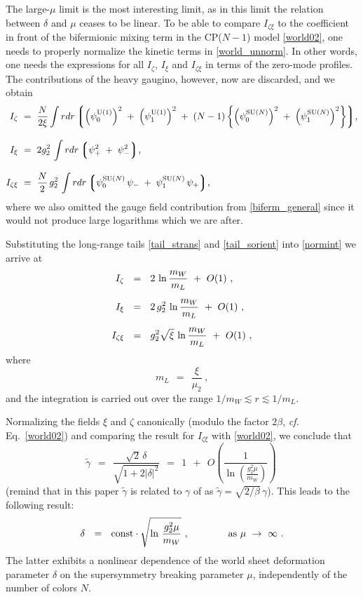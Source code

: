\documentclass[12pt]{article}
\def\beq{\begin{equation}}
\def\eeq{\end{equation}}
\newcommand{\wt}{\widetilde}
\newcommand{\lgr}{\left\lgroup}
\newcommand{\rgr}{\right\rgroup}
\newcommand{\poU}{\psi_0^{\rm U(1)}}
\newcommand{\plU}{\psi_1^{\rm U(1)}}
\newcommand{\poN}{\psi_0^\text{SU($N$)}}
\newcommand{\plN}{\psi_1^\text{SU($N$)}}
\newcommand{\tgamma}{\wt{\gamma}}
\begin{document}
	The large-$\mu$ limit is the most interesting limit, as in this limit the relation between $ \delta $ 
	and $ \mu $ ceases to be linear. 
	To be able to compare $ I_{\zeta\xi} $ to the coefficient in front of the bifermionic mixing term in 
	the CP($ N-1 $) model \eqref{world02}, one needs to properly normalize the kinetic terms in \eqref{world_unnorm}.
	In other words, one needs the expressions for all  $ I_\zeta $, $ I_\xi $ and $ I_{\zeta\xi} $ in terms
	of the zero-mode profiles.
	The contributions of the heavy gaugino, however, now are discarded, and we obtain
\begin{align}
%
\notag
	I_\zeta & ~=~ \frac{N}{2\xi} 
		\int r dr 
			\lgr \left(\poU\right)^2 \;+\; \left(\plU\right)^2 \;+\; 
				(N-1)\left\{\left(\poN\right)^2 \;+\;
				            \left(\plN\right)^2 \right\} 
			\rgr \!, \\[3mm]
%
\label{normint}
	I_\xi & ~=~ 2g_2^2\, 
		\int r dr \lgr  \psi_+^2 \;+\; \psi_-^2 \rgr\!, \\[3mm]
%
\notag
	I_{\zeta\xi} & ~=~
		\frac{N}{2}\, g_2^2\, 
		\int r dr \lgr \poN\, \psi_- \;+\; \plN\, \psi_+ \rgr \!,
\end{align}
	where we also omitted the gauge field contribution from \eqref{biferm_general} since it would not
	produce large logarithms which we are after. 

	Substituting the long-range tails \eqref{tail_strans} and \eqref{tail_sorient} into \eqref{normint}
	we arrive at
\begin{align}
%
\notag
	I_\zeta & ~~=~~ 2\, \ln \frac{m_W}{m_L} ~+~ O(1)~, \\[2mm]
%
\label{logs}
	I_\xi & ~~=~~ 2\,g_2^2 \, \ln \frac{m_W}{m_L} ~+~ O(1)~, \\[2mm]
%
\notag
	I_{\zeta\xi} & ~~=~~ g_2^2\sqrt{\xi}\, \ln \frac{m_W}{m_L} ~+~ O(1)~, 
\end{align}
	where
\[
	m_L ~~=~~ \frac{\xi}{\mu_2}~,
\]
	and the integration is carried out over the range $ 1/m_W \lesssim r \lesssim 1/m_L $.

	Normalizing the fields $ \xi $ and $ \zeta $ canonically (modulo the factor  $ 2\beta $, 
	{\it cf.} Eq.~\eqref{world02}) and comparing the result for $ I_{\zeta\xi} $ with \eqref{world02},
	we conclude that
\beq
\label{gammaresult}
	\tgamma ~~=~~ 
		\frac { \sqrt{2}\,\delta } { \sqrt{ 1 + 2 | \delta |^2 } } 
		~~=~~ 1 ~~+~~ O\left(\frac{1}{\ln\left(\frac{g_2^2\mu}{m_W}\right)}\right)~
\eeq
	(remind that in this paper $ \tgamma $ is related to $ \gamma $ of \cite{SYhet} as
	$ \tgamma = \sqrt{2/\beta}\, \gamma $).
	This leads to the following result:
\beq
\label{deltaresult}
	\delta~~=~~ 
	{\rm const} \cdot \sqrt{\ln\, \frac{g_2^2\mu}{m_W}}~,
	\qquad\qquad \text{as $\mu ~\to~ \infty$}~.
\eeq
	The latter exhibits a nonlinear dependence of the world sheet deformation 
	parameter $ \delta $ on the 
	supersymmetry breaking parameter $ \mu $, independently of the number of colors $ N $.
\end{document}
